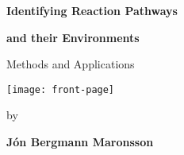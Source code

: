 \begin{titlepage}

%
%


\vspace*{\fill}
\centerline{\LARGE{\textbf{Identifying Reaction Pathways}}}
\vspace{0.5em}
\centerline{\LARGE{\textbf{and their Environments}}}
\vspace{0.5em}
\centerline{Methods and Applications}

\vspace{3em}

\centering
\texttt{[image: front-page]}
\vspace{3em}

\centerline{\small{by}}
\vspace{0.5em}
\centerline{\textbf{J\'on Bergmann Maronsson}}
\vspace*{\fill}

\end{titlepage}
